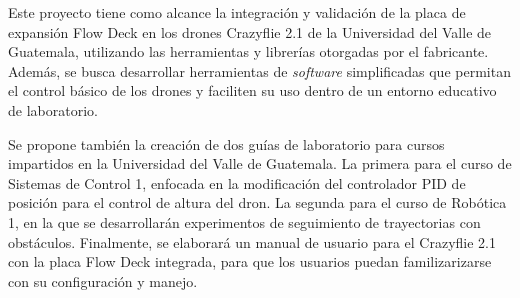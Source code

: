 Este proyecto tiene como alcance la integración y validación de la placa de expansión Flow Deck en los drones Crazyflie 2.1 de la Universidad del Valle de Guatemala, utilizando las herramientas y librerías otorgadas por el fabricante. Además, se busca desarrollar herramientas de \textit{software} simplificadas que permitan el control básico de los drones y faciliten su uso dentro de un entorno educativo de laboratorio.

Se propone también la creación de dos guías de laboratorio para cursos impartidos en la Universidad del Valle de Guatemala. La primera para el curso de Sistemas de Control 1, enfocada en la modificación del controlador PID de posición para el control de altura del dron. La segunda para el curso de Robótica 1, en la que se desarrollarán experimentos de seguimiento de trayectorias con obstáculos. Finalmente, se elaborará un manual de usuario para el Crazyflie 2.1 con la placa Flow Deck integrada, para que los usuarios puedan familizarizarse con su configuración y manejo. 